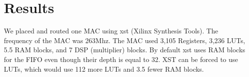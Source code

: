 \section{Results}
\label{sec:mac_results}
We placed and routed one MAC using xst (Xilinx Synthesis Tools). The frequency of the MAC was 263Mhz. The MAC used 3,105 Registers, 3,236 LUTs, 5.5 RAM blocks, and 7 DSP (multiplier) blocks. By default xst uses RAM blocks for the FIFO even though their depth is equal to 32. XST can be forced to use LUTs, which would use 112 more LUTs and 3.5 fewer RAM blocks.
